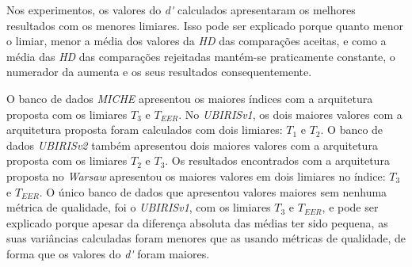 \par Nos experimentos, os valores do \textit{\acrshort{d'}} calculados apresentaram os melhores resultados com os menores limiares. Isso pode ser explicado porque quanto menor o limiar, menor a média dos valores da \textit{\acrshort{HD}} das comparações aceitas, e como a média das \textit{\acrshort{HD}} das comparações rejeitadas mantém-se praticamente constante, o numerador da  aumenta e os seus resultados consequentemente. 


\par O banco de dados \textit{MICHE} apresentou os maiores índices com a arquitetura proposta com os limiares $T_{3}$ e $T_{EER}$. No \textit{UBIRISv1}, os dois maiores valores com a arquitetura proposta foram calculados com dois limiares: $T_{1}$ e $T_{2}$. O banco de dados \textit{UBIRISv2} também apresentou dois maiores valores com a arquitetura proposta com os limiares $T_{2}$ e $T_{3}$. Os resultados encontrados com a arquitetura proposta no \textit{\acrshort{Warsaw}} apresentou os maiores valores em dois limiares no índice: $T_{3}$ e $T_{EER}$. O único banco de dados que apresentou valores maiores sem nenhuma métrica de qualidade, foi o \textit{UBIRISv1}, com os limiares $T_{3}$ e $T_{EER}$, e pode ser explicado porque apesar da diferença absoluta das médias ter sido pequena, as suas variâncias calculadas foram menores que as usando métricas de qualidade, de forma que os valores do \textit{\acrshort{d'}} foram maiores.


